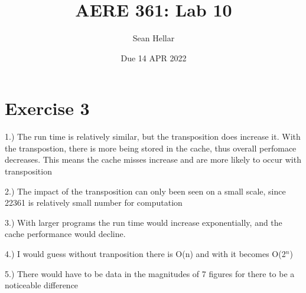 \documentclass{article}
\title{AERE 361: Lab 10}
\date{Due 14 APR 2022}
\author{Sean Hellar}
\begin{document}
\maketitle
\newpage

\section{Exercise 3}

1.) The run time is relatively similar, but the transposition does increase it. With the transpostion, there is more being stored in the cache, thus overall perfomace decreases. This means the cache misses increase and are more likely to occur with transposition 

2.) The impact of the transposition can only been seen on a small scale, since 22361 is relatively small number for computation

3.) With larger programs the run time would increase exponentially, and the cache performance would decline. 

4.) I would guess without tranposition there is O(n) and with it becomes O(2$^{n}$)

5.) There would have to be data in the magnitudes of 7 figures for there to be a noticeable difference 
\end{document}
